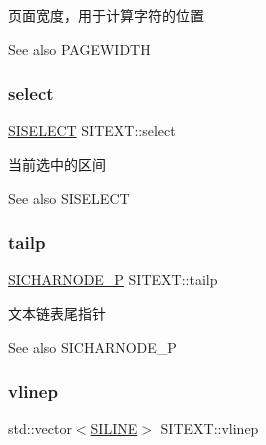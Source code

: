 页面宽度，用于计算字符的位置 

\begin{DoxySeeAlso}{See also}
P\+A\+G\+E\+W\+I\+D\+TH 
\end{DoxySeeAlso}
\mbox{\label{class_s_i_t_e_x_t_a536f8decde35b0149619ca1719c887b0}} 
\subsubsection{\texorpdfstring{select}{select}}
{\footnotesize\ttfamily \hyperlink{struct_s_i_r_a_n_g_e}{S\+I\+S\+E\+L\+E\+CT} S\+I\+T\+E\+X\+T\+::select}



当前选中的区间 

\begin{DoxySeeAlso}{See also}
S\+I\+S\+E\+L\+E\+CT 
\end{DoxySeeAlso}
\mbox{\label{class_s_i_t_e_x_t_a65fc82385d60763d2f3bcca67abf99bc}} 
\subsubsection{\texorpdfstring{tailp}{tailp}}
{\footnotesize\ttfamily \hyperlink{class_s_i_c_h_a_r_n_o_d_e}{S\+I\+C\+H\+A\+R\+N\+O\+D\+E\+\_\+P} S\+I\+T\+E\+X\+T\+::tailp}



文本链表尾指针 

\begin{DoxySeeAlso}{See also}
S\+I\+C\+H\+A\+R\+N\+O\+D\+E\+\_\+P 
\end{DoxySeeAlso}
\mbox{\label{class_s_i_t_e_x_t_abdabb47ab701f95f73b806df2c440347}} 
\subsubsection{\texorpdfstring{vlinep}{vlinep}}
{\footnotesize\ttfamily std\+::vector$<$\hyperlink{struct_s_i_r_a_n_g_e}{S\+I\+L\+I\+NE}$>$ S\+I\+T\+E\+X\+T\+::vlinep}



